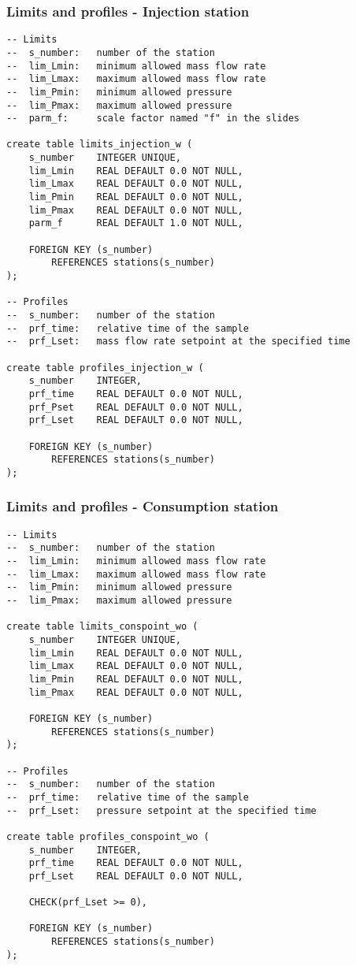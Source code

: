 \documentclass[10pt]{article}
\begin{document}
\subsubsection{Limits and profiles - Injection station}

\begin{verbatim}
-- Limits
--  s_number:   number of the station
--  lim_Lmin:   minimum allowed mass flow rate
--  lim_Lmax:   maximum allowed mass flow rate
--  lim_Pmin:   minimum allowed pressure
--  lim_Pmax:   maximum allowed pressure
--  parm_f:     scale factor named "f" in the slides

create table limits_injection_w (
    s_number    INTEGER UNIQUE,
    lim_Lmin    REAL DEFAULT 0.0 NOT NULL,
    lim_Lmax    REAL DEFAULT 0.0 NOT NULL,
    lim_Pmin    REAL DEFAULT 0.0 NOT NULL,
    lim_Pmax    REAL DEFAULT 0.0 NOT NULL,
    parm_f      REAL DEFAULT 1.0 NOT NULL,

    FOREIGN KEY (s_number)
        REFERENCES stations(s_number)
);

-- Profiles
--  s_number:   number of the station
--  prf_time:   relative time of the sample
--  prf_Lset:   mass flow rate setpoint at the specified time

create table profiles_injection_w (
    s_number    INTEGER,
    prf_time    REAL DEFAULT 0.0 NOT NULL,
    prf_Pset    REAL DEFAULT 0.0 NOT NULL,
    prf_Lset    REAL DEFAULT 0.0 NOT NULL,

    FOREIGN KEY (s_number)
        REFERENCES stations(s_number)
);
\end{verbatim}

\subsubsection{Limits and profiles - Consumption station}

\begin{verbatim}
-- Limits
--  s_number:   number of the station
--  lim_Lmin:   minimum allowed mass flow rate
--  lim_Lmax:   maximum allowed mass flow rate
--  lim_Pmin:   minimum allowed pressure
--  lim_Pmax:   maximum allowed pressure

create table limits_conspoint_wo (
    s_number    INTEGER UNIQUE,
    lim_Lmin    REAL DEFAULT 0.0 NOT NULL,
    lim_Lmax    REAL DEFAULT 0.0 NOT NULL,
    lim_Pmin    REAL DEFAULT 0.0 NOT NULL,
    lim_Pmax    REAL DEFAULT 0.0 NOT NULL,

    FOREIGN KEY (s_number)
        REFERENCES stations(s_number)
);

-- Profiles
--  s_number:   number of the station
--  prf_time:   relative time of the sample
--  prf_Lset:   pressure setpoint at the specified time

create table profiles_conspoint_wo (
    s_number    INTEGER,
    prf_time    REAL DEFAULT 0.0 NOT NULL,
    prf_Lset    REAL DEFAULT 0.0 NOT NULL,

    CHECK(prf_Lset >= 0),

    FOREIGN KEY (s_number)
        REFERENCES stations(s_number)
);
\end{verbatim}
\end{document}

